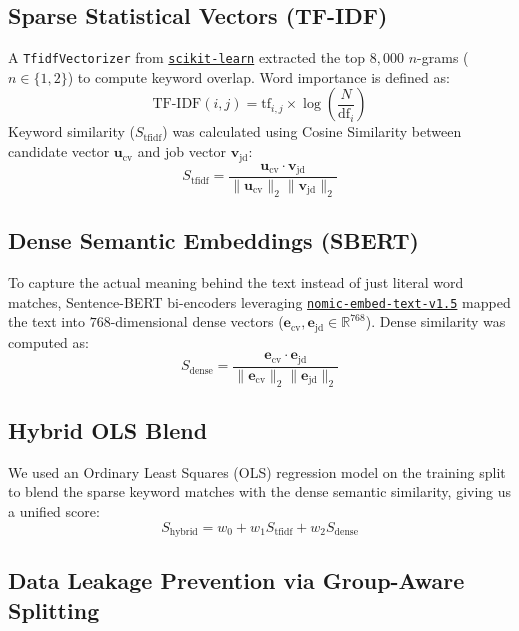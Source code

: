 \documentclass[12pt,a4paper,oneside]{report}
\begin{document}
\subsection{Sparse Statistical Vectors (TF-IDF)}
A \texttt{TfidfVectorizer} from \href{https://scikit-learn.org/}{\texttt{scikit-learn}} extracted the top $8,000$ $n$-grams ($n \in \{1, 2\}$) to compute keyword overlap. Word importance is defined as:
\begin{equation}
\text{TF-IDF}(i, j) = \text{tf}_{i,j} \times \log\left(\frac{N}{\text{df}_i}\right)
\end{equation}
Keyword similarity ($S_{\text{tfidf}}$) was calculated using Cosine Similarity between candidate vector $\mathbf{u}_{\text{cv}}$ and job vector $\mathbf{v}_{\text{jd}}$:
\begin{equation}
S_{\text{tfidf}} = \frac{\mathbf{u}_{\text{cv}} \cdot \mathbf{v}_{\text{jd}}}{\|\mathbf{u}_{\text{cv}}\|_2 \|\mathbf{v}_{\text{jd}}\|_2}
\end{equation}

\subsection{Dense Semantic Embeddings (SBERT)}
To capture the actual meaning behind the text instead of just literal word matches, Sentence-BERT bi-encoders leveraging \href{https://huggingface.co/nomic-ai/nomic-embed-text-v1.5}{\texttt{nomic-embed-text-v1.5}} mapped the text into $768$-dimensional dense vectors ($\mathbf{e}_{\text{cv}}, \mathbf{e}_{\text{jd}} \in \mathbb{R}^{768}$). Dense similarity was computed as:
\begin{equation}
S_{\text{dense}} = \frac{\mathbf{e}_{\text{cv}} \cdot \mathbf{e}_{\text{jd}}}{\|\mathbf{e}_{\text{cv}}\|_2 \|\mathbf{e}_{\text{jd}}\|_2}
\end{equation}

\subsection{Hybrid OLS Blend}
We used an Ordinary Least Squares (OLS) regression model on the training split to blend the sparse keyword matches with the dense semantic similarity, giving us a unified score:
\begin{equation}
S_{\text{hybrid}} = w_0 + w_1 S_{\text{tfidf}} + w_2 S_{\text{dense}}
\end{equation}

\subsection{Data Leakage Prevention via Group-Aware Splitting}
\end{document}
